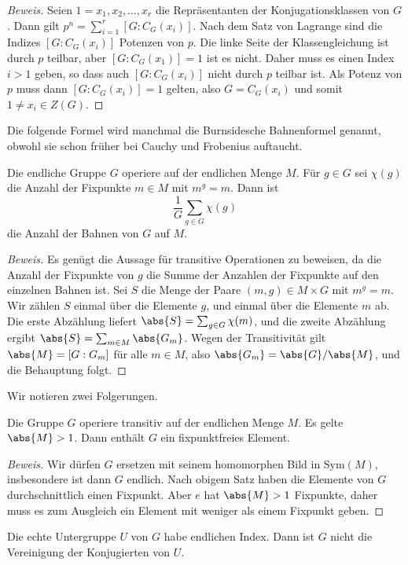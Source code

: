 \documentclass[12pt,a4paper,twoside]{article}
\begin{document}
\begin{proof}[Beweis]
  Seien $1=x_1,x_2,\dots,x_r$ die Repr\"asentanten der Konjugationsklassen von
  $G$. Dann gilt $p^n=\sum_{i=1}^r[G:C_G(x_i)]$. Nach dem Satz von Lagrange
  sind die Indizes $[G:C_G(x_i)]$ Potenzen von $p$. Die linke Seite der
  Klassengleichung ist durch $p$ teilbar, aber $[G:C_G(x_1)]=1$ ist es
  nicht. Daher muss es einen Index $i>1$ geben, so dass auch $[G:C_G(x_i)]$
  nicht durch $p$ teilbar ist. Als Potenz von $p$ muss dann $[G:C_G(x_i)]=1$
  gelten, also $G=C_G(x_i)$ und somit $1\ne x_i\in Z(G)$.
\end{proof}
Die folgende Formel wird manchmal die Burnsidesche Bahnenformel genannt,
obwohl sie schon fr\"uher bei Cauchy und Frobenius auftaucht.
\begin{Satz}
  Die endliche Gruppe $G$ operiere auf der endlichen Menge $M$. F\"ur $g\in G$
  sei $\chi(g)$ die Anzahl der Fixpunkte $m\in M$ mit $m^g=m$. Dann ist
\[
\frac{1}{G}\sum_{g\in G}\chi(g)
\]
die Anzahl der Bahnen von $G$ auf $M$.
\end{Satz}
\begin{proof}[Beweis]
  Es gen\"ugt die Aussage f\"ur transitive Operationen zu beweisen, da die
  Anzahl der Fixpunkte von $g$ die Summe der Anzahlen der Fixpunkte auf den
  einzelnen Bahnen ist. Sei $S$ die Menge der Paare $(m,g)\in M\times G$ mit
  $m^g=m$. Wir z\"ahlen $S$ einmal \"uber die Elemente $g$, und einmal \"uber
  die Elemente $m$ ab. Die erste Abz\"ahlung liefert $\abs{S}=\sum_{g\in
    G}\chi(m)$, und die zweite Abz\"ahlung ergibt $\abs{S}=\sum_{m\in
    M}\abs{G_m}$. Wegen der Transitivit\"at gilt $\abs{M}=[G:G_m]$ f\"ur alle
  $m\in M$, also $\abs{G_m}=\abs{G}/\abs{M}$, und die Behauptung folgt.
\end{proof}
Wir notieren zwei Folgerungen.
\begin{Korollar}
  Die Gruppe $G$ operiere transitiv auf der endlichen Menge $M$. Es gelte
  $\abs{M}>1$. Dann enth\"alt $G$ ein fixpunktfreies Element.
\end{Korollar}
\begin{proof}[Beweis]
  Wir d\"urfen $G$ ersetzen mit seinem homomorphen Bild in $\text{Sym}(M)$,
  insbesondere ist dann $G$ endlich. Nach obigem Satz haben die Elemente von
  $G$ durchschnittlich einen Fixpunkt. Aber $e$ hat $\abs{M}>1$ Fixpunkte,
  daher muss es zum Ausgleich ein Element mit weniger als einem Fixpunkt
  geben.
\end{proof}
\begin{Korollar}
  Die echte Untergruppe $U$ von $G$ habe endlichen Index. Dann ist $G$ nicht
  die Vereinigung der Konjugierten von $U$.
\end{Korollar}
\end{document}
